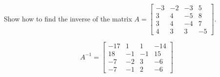 
\begin{exerciseStatement}


Show how to find the inverse of the matrix \(A= \left[\begin{array}{cccc}
-3 & -2 & -3 & 5 \\
3 & 4 & -5 & 8 \\
3 & 4 & -4 & 7 \\
4 & 3 & 3 & -5
\end{array}\right] \).


\end{exerciseStatement}
    
\begin{exerciseAnswer} 
\[A^{-1}= \left[\begin{array}{cccc}
-17 & 1 & 1 & -14 \\
18 & -1 & -1 & 15 \\
-7 & -2 & 3 & -6 \\
-7 & -1 & 2 & -6
\end{array}\right] \]
\end{exerciseAnswer}
    
